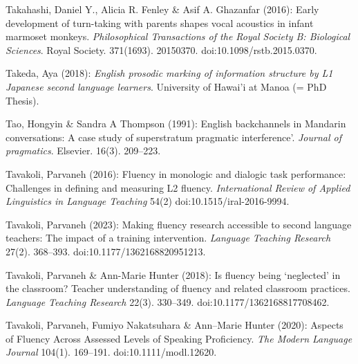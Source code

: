 \begin{styleBibliography}
Takahashi, Daniel Y., Alicia R. Fenley \& Asif A. Ghazanfar (2016): Early development of turn-taking with parents shapes vocal acoustics in infant marmoset monkeys. \textit{Philosophical Transactions of the Royal Society B: Biological Sciences}. Royal Society. 371(1693). 20150370. doi:10.1098/rstb.2015.0370.
\end{styleBibliography}

\begin{styleBibliography}
Takeda, Aya (2018): \textit{English prosodic marking of information structure by L1 Japanese second language learners}. University of Hawai’i at Manoa (= PhD Thesis).
\end{styleBibliography}

\begin{styleBibliography}
Tao, Hongyin \& Sandra A Thompson (1991): English backchannels in Mandarin conversations: A case study of superstratum pragmatic {\textasciigrave}interference’. \textit{Journal of pragmatics}. Elsevier. 16(3). 209–223.
\end{styleBibliography}

\begin{styleBibliography}
Tavakoli, Parvaneh (2016): Fluency in monologic and dialogic task performance: Challenges in defining and measuring L2 fluency. \textit{International Review of Applied Linguistics in Language Teaching} 54(2) doi:10.1515/iral-2016-9994.
\end{styleBibliography}

\begin{styleBibliography}
Tavakoli, Parvaneh (2023): Making fluency research accessible to second language teachers: The impact of a training intervention. \textit{Language Teaching Research} 27(2). 368–393. doi:10.1177/1362168820951213.
\end{styleBibliography}

\begin{styleBibliography}
Tavakoli, Parvaneh \& Ann-Marie Hunter (2018): Is fluency being ‘neglected’ in the classroom? Teacher understanding of fluency and related classroom practices. \textit{Language Teaching Research} 22(3). 330–349. doi:10.1177/1362168817708462.
\end{styleBibliography}

\begin{styleBibliography}
Tavakoli, Parvaneh, Fumiyo Nakatsuhara \& Ann–Marie Hunter (2020): Aspects of Fluency Across Assessed Levels of Speaking Proficiency. \textit{The Modern Language Journal} 104(1). 169–191. doi:10.1111/modl.12620.
\end{styleBibliography}

